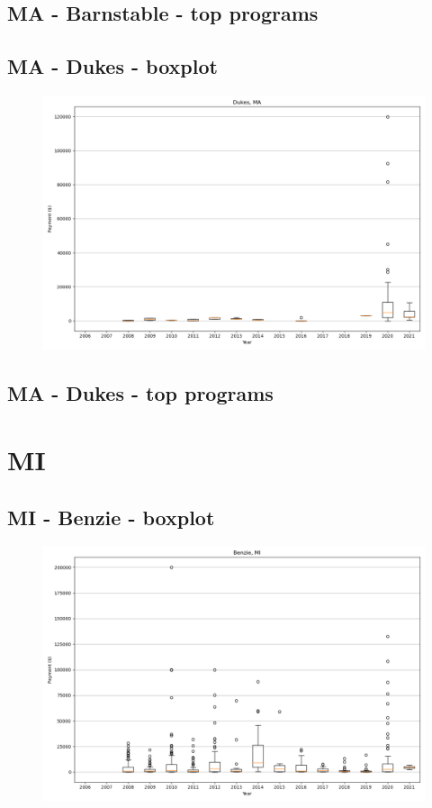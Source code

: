 \subsection*{MA - Barnstable - top programs}

\newpage
\subsection*{MA - Dukes - boxplot}
\begin{figure}[h]
\centering
\includegraphics[width=7in]{../output/boxplots/counties/Dukes-MA_boxplot.png}
\end{figure}


\subsection*{MA - Dukes - top programs}

\newpage
\section*{MI}
\subsection*{MI - Benzie - boxplot}
\begin{figure}[h]
\centering
\includegraphics[width=7in]{../output/boxplots/counties/Benzie-MI_boxplot.png}
\end{figure}


